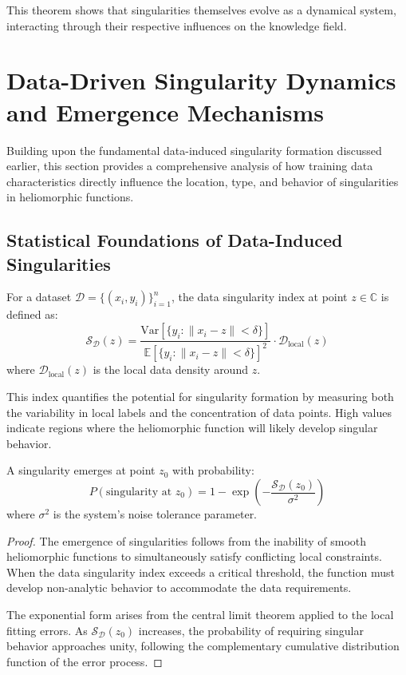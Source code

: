 This theorem shows that singularities themselves evolve as a dynamical system, interacting through their respective influences on the knowledge field.

\section{Data-Driven Singularity Dynamics and Emergence Mechanisms}

Building upon the fundamental data-induced singularity formation discussed earlier, this section provides a comprehensive analysis of how training data characteristics directly influence the location, type, and behavior of singularities in heliomorphic functions.

\subsection{Statistical Foundations of Data-Induced Singularities}

\begin{definition}
For a dataset $\mathcal{D} = \{(x_i, y_i)\}_{i=1}^n$, the data singularity index at point $z \in \mathbb{C}$ is defined as:
\begin{equation}
\mathcal{S}_{\mathcal{D}}(z) = \frac{\text{Var}[\{y_i : \|x_i - z\| < \delta\}]}{\mathbb{E}[\{y_i : \|x_i - z\| < \delta\}]^2} \cdot \mathcal{D}_{\text{local}}(z)
\end{equation}
where $\mathcal{D}_{\text{local}}(z)$ is the local data density around $z$.
\end{definition}

This index quantifies the potential for singularity formation by measuring both the variability in local labels and the concentration of data points. High values indicate regions where the heliomorphic function will likely develop singular behavior.

\begin{theorem}
A singularity emerges at point $z_0$ with probability:
\begin{equation}
P(\text{singularity at } z_0) = 1 - \exp\left(-\frac{\mathcal{S}_{\mathcal{D}}(z_0)}{\sigma^2}\right)
\end{equation}
where $\sigma^2$ is the system's noise tolerance parameter.
\end{theorem}

\begin{proof}
The emergence of singularities follows from the inability of smooth heliomorphic functions to simultaneously satisfy conflicting local constraints. When the data singularity index exceeds a critical threshold, the function must develop non-analytic behavior to accommodate the data requirements.

The exponential form arises from the central limit theorem applied to the local fitting errors. As $\mathcal{S}_{\mathcal{D}}(z_0)$ increases, the probability of requiring singular behavior approaches unity, following the complementary cumulative distribution function of the error process.
\end{proof}

